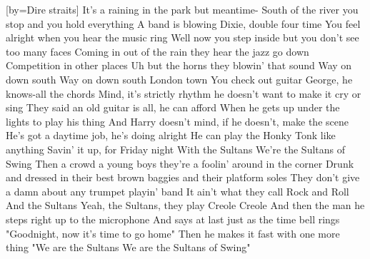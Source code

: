 [by={Dire straits}]
  \beginverse
  It's a raining in the park but meantime-
  South of the river you stop and you hold everything
  A band is blowing Dixie, double four time
  You feel alright when you hear the music ring
  \endverse
  \beginverse  
  Well now you step inside but you don't see too many faces
  Coming in out of the rain they hear the jazz go down
  Competition in other places
  Uh but the horns they blowin' that sound
  Way on down south
  Way on down south
  London town
  \endverse
  \beginverse  
  You check out guitar George, he knows-all the chords
  Mind, it's strictly rhythm he doesn't want to make it cry or sing
  They said an old guitar is all, he can afford
  When he gets up under the lights to play his thing
  \endverse
  \beginverse  
  And Harry doesn't mind, if he doesn't, make the scene
  He's got a daytime job, he's doing alright
  He can play the Honky Tonk like anything
  Savin' it up, for Friday night
  With the Sultans
  We're the Sultans of Swing
  \endverse
  \beginverse  
  Then a crowd a young boys they're a foolin' around in the corner
  Drunk and dressed in their best brown baggies and their platform soles
  They don't give a damn about any trumpet playin' band
  It ain't what they call Rock and Roll
  And the Sultans
  Yeah, the Sultans, they play Creole
  Creole
  \endverse
  \beginverse  
  And then the man he steps right up to the microphone
  And says at last just as the time bell rings
  "Goodnight, now it's time to go home"
  Then he makes it fast with one more thing
  "We are the Sultans
  We are the Sultans of Swing"
  \endverse
\endsong
